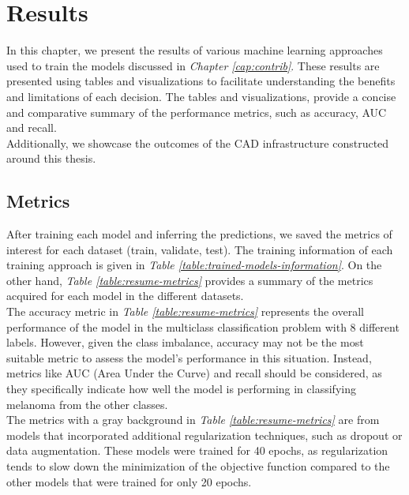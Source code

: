 \chapter{Results}
\label{cap:result}

In this chapter, we present the results of various machine learning
approaches used to train the models discussed in \textit{Chapter \ref{cap:contrib}}.
These results are presented using tables and visualizations to
facilitate understanding the benefits and limitations of each decision. The tables and visualizations,
provide a concise and comparative summary of the performance metrics, such as accuracy, AUC and recall. \\

Additionally, we showcase the outcomes of the CAD infrastructure constructed around this thesis.


\section{Metrics}

After training each model and inferring the predictions,
we saved the metrics of interest for each dataset (train, validate, test).
The training information of each training approach is given in \textit{Table \ref{table:trained-models-information}}.
On the other hand, \textit{Table \ref{table:resume-metrics}} provides a summary of the metrics acquired for each model in the different datasets. \\

The accuracy metric in \textit{Table \ref{table:resume-metrics}} represents
the overall performance of the model in the multiclass classification problem with 8 different labels.
However, given the class imbalance, accuracy may not be the most suitable metric to assess the model's performance in this situation.
Instead, metrics like AUC (Area Under the Curve) and recall should be considered,
as they specifically indicate how well the model is performing in classifying melanoma from the other classes. \\

The metrics with a gray background in \textit{Table \ref{table:resume-metrics}}
are from models that incorporated additional regularization techniques, such as dropout or data augmentation.
These models were trained for 40 epochs,
as regularization tends to slow down the minimization of the objective function compared to the other models that were trained for only 20 epochs. \\

